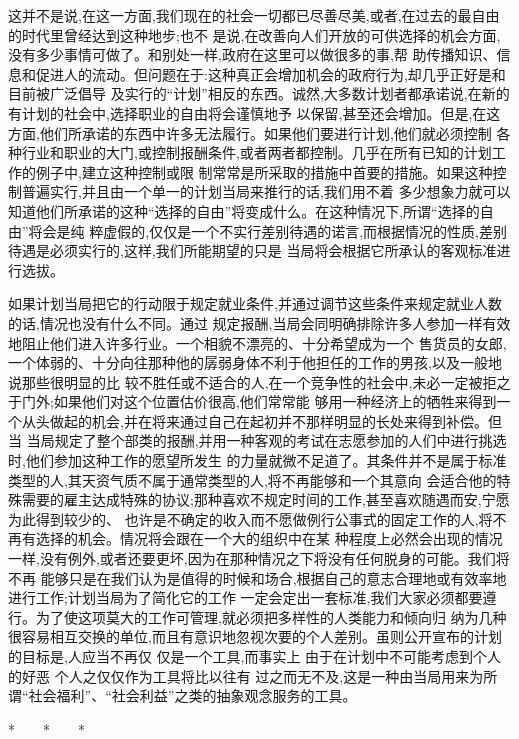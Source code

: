 ﻿\documentclass[12pt]{article}
\begin{document}
这并不是说,在这一方面,我们现在的社会一切都已尽善尽美,或者,在过去的最自由的时代里曾经达到这种地步;也不
是说,在改善向人们开放的可供选择的机会方面,没有多少事情可做了。和别处一样,政府在这里可以做很多的事,帮
助传播知识、信息和促进人的流动。但问题在于:这种真正会增加机会的政府行为,却几乎正好是和目前被广泛倡导
及实行的``计划''相反的东西。诚然,大多数计划者都承诺说,在新的有计划的社会中,选择职业的自由将会谨慎地予
以保留,甚至还会增加。但是,在这方面,他们所承诺的东西中许多无法履行。如果他们要进行计划,他们就必须控制
各种行业和职业的大门,或控制报酬条件,或者两者都控制。几乎在所有已知的计划工作的例子中,建立这种控制或限
制常常是所采取的措施中首要的措施。如果这种控制普遍实行,并且由一个单一的计划当局来推行的话,我们用不着
多少想象力就可以知道他们所承诺的这种``选择的自由''将变成什么。在这种情况下,所谓``选择的自由''将会是纯
粹虚假的,仅仅是一个不实行差别待遇的诺言,而根据情况的性质,差别待遇是必须实行的,这样,我们所能期望的只是
当局将会根据它所承认的客观标准进行选拔。

如果计划当局把它的行动限于规定就业条件,并通过调节这些条件来规定就业人数的话,情况也没有什么不同。通过
规定报酬,当局会同明确排除许多人参加一样有效地阻止他们进入许多行业。一个相貌不漂亮的、十分希望成为一个
售货员的女郎,一个体弱的、十分向往那种他的孱弱身体不利于他担任的工作的男孩,以及一般地说那些很明显的比
较不胜任或不适合的人,在一个竞争性的社会中,未必一定被拒之于门外;如果他们对这个位置估价很高,他们常常能
够用一种经济上的牺牲来得到一个从头做起的机会,并在将来通过自己在起初并不那样明显的长处来得到补偿。但当
当局规定了整个部类的报酬,并用一种客观的考试在志愿参加的人们中进行挑选时,他们参加这种工作的愿望所发生
的力量就微不足道了。其条件并不是属于标准类型的人,其天资气质不属于通常类型的人,将不再能够和一个其意向
会适合他的特殊需要的雇主达成特殊的协议;那种喜欢不规定时间的工作,甚至喜欢随遇而安,宁愿为此得到较少的、
也许是不确定的收入而不愿做例行公事式的固定工作的人,将不再有选择的机会。情况将会跟在一个大的组织中在某
种程度上必然会出现的情况一样,没有例外,或者还要更坏,因为在那种情况之下将没有任何脱身的可能。我们将不再
能够只是在我们认为是值得的时候和场合,根据自己的意志合理地或有效率地进行工作;计划当局为了简化它的工作
一定会定出一套标准,我们大家必须都要遵行。为了使这项莫大的工作可管理,就必须把多样性的人类能力和倾向归
纳为几种很容易相互交换的单位,而且有意识地忽视次要的个人差别。虽则公开宣布的计划的目标是,人应当不再仅
仅是一个工具,而事实上 \myrule 由于在计划中不可能考虑到个人的好恶 \myrule 个人之仅仅作为工具将比以往有
过之而无不及,这是一种由当局用来为所谓``社会福利''、``社会利益''之类的抽象观念服务的工具。

*　　*　　*
\end{document}

